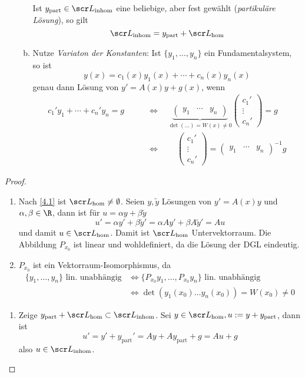 \begin{st}
\begin{enumerate}[1)]
\begin{enumerate}[a)]
					Ist $y_{\text{part}} \in \scr L_{\text{inhom}}$ eine beliebige, aber fest gewählt (\emph{partikuläre Lösung}), so gilt
					\[
						\scr L_{\text{inhom}} = y_{\text{part}} + \scr L_{\text{hom}}
					\]
				\item
					Nutze \emph{Variaton der Konstanten}:
					Ist $\{y_1,\dotsc, y_n\}$ ein Fundamentalsystem, so ist
					\[
						y(x) = c_1(x) y_1(x) + \dotsb + c_n(x) y_n(x)
					\]
					genau dann Lösung von $y' = A(x)y + g(x)$, wenn
					\begin{align*}
						c_1'y_1 + \dotsb + c_n'y_n = g
						\qquad &\iff \quad
						\underbrace{\begin{pmatrix}
							y_1 & \cdots & y_n
						\end{pmatrix}}_{\det(\dotsc) = W(x) \neq 0} \begin{pmatrix}
							c_1' \\ \vdots \\ c_n'
						\end{pmatrix} = g \\
						& \iff \qquad \begin{pmatrix}
							c_1' \\ \vdots \\ c_n'
						\end{pmatrix} = \begin{pmatrix}
							y_1 & \cdots & y_n
						\end{pmatrix}^{-1} g
					\end{align*}
			\end{enumerate}
	\end{enumerate}
	\begin{proof}
		\begin{enumerate}[{1}a)]
			\item
				Nach \ref{4.1} ist $\scr L_{\text{hom}} \neq \emptyset$.
				Seien $y, \tilde y$ Lösungen von $y' = A(x)y$ und $\alpha, \beta \in \R$, dann ist für $u = \alpha y + \beta \tilde y$
				\[
					u' = \alpha y' + \beta \tilde y' = \alpha Ay' + \beta A \tilde y' = Au
				\]
				und damit $u \in \scr L_{\text{hom}}$.
				Damit ist $\scr L_{\text{hom}}$ Untervektorraum.
				Die Abbildung $P_{x_0}$ ist linear und wohldefiniert, da die Lösung der DGL eindeutig.
			\item
				$P_{x_0}$ ist ein Vektorraum-Isomorphismus, da
				\begin{align*}
					\{y_1, \dotsc, y_n\} \text{ lin. unabhängig}
					& \iff \{P_{x_0} y_1, \dotsc, P_{x_0} y_n \} \text{ lin. unabhängig} \\
					& \iff \det(y_1(x_0) \dotso y_n(x_0)) = W(x_0) \neq 0
				\end{align*}
		\end{enumerate}
		\begin{enumerate}[{2}a)]
			\item
				Zeige $y_{\text{part}} + \scr L_{\text{hom}} \subset \scr L_{\text{inhom}}$.
				Sei $y \in \scr L_{\text{hom}}, u := y + y_{\text{part}}$, dann ist
				\[
					u' = y' + y_{\text{part}}' = Ay + Ay_{\text{part}} + g = Au + g
				\]
				also $u \in \scr L_{\text{inhom}}$.


\end{enumerate}
\end{proof}
\end{st}

